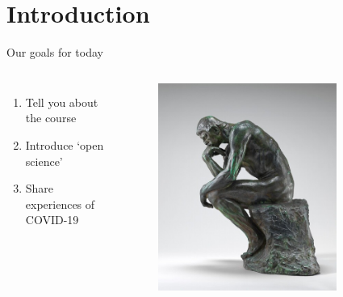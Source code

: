 \section{Introduction}
\label{sec:introduction}

\begin{frame}{Our goals for today}
    
    \begin{columns}[t]
        \begin{enumerate}
            \item Tell you about the course
            \item Introduce `open science'
            \item Share experiences of COVID-19
        \end{enumerate}

        \begin{figure}
            \includegraphics[width=0.8\textwidth]{images/the_thinker_NPA_1942_5_12.jpg}
        \end{figure}
    \end{columns}
\end{frame}

